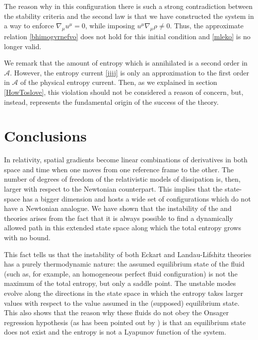 \documentclass[a4paper, amsfonts, amssymb, amsmath, reprint, showkeys, nofootinbib, twoside]{revtex4-1}
\begin{document}
The reason why in this configuration there is such a strong contradiction between the stability criteria and the second law is that we have constructed the system in a way to enforce $\nabla_\mu u^\mu =0$, while imposing $u^\mu \nabla_\mu \rho \neq 0$. Thus, the approximate relation \eqref{bhimogvrnefvo} does not hold for this initial condition and \eqref{mleko} is no longer valid. 

We remark that the amount of entropy which is annihilated is a second order in $\mathcal{A}$. However, the entropy current \eqref{jjjj} is only an approximation to the first order in $\mathcal{A}$ of the physical entropy current. Then, as we explained in section \ref{HowToslove}, this violation should not be considered a reason of concern, but, instead, represents the fundamental origin of the success of the theory.


\section{Conclusions}

In relativity, spatial gradients become linear combinations of derivatives in both space and time when one moves from one reference frame to the other. The number of degrees of freedom of the relativistic models of dissipation is, then, larger with respect to the Newtonian counterpart. This implies that the state-space has a bigger dimension and hosts a wide set of configurations which do not have a Newtonian analogue. We have shown that the instability of the \citet{Eckart1940} and \citet{landau6} theories arises from the fact that it is always possible to find a dynamically allowed path in this extended state space along which the total entropy grows with no bound. 

This fact tells us that the instability of both Eckart and Landau-Lifshitz theories has a purely thermodynamic nature: the assumed equilibrium state of the fluid (such as, for example, an homogeneous perfect fluid configuration) is not the maximum of the total entropy, but only a saddle point. The unstable modes evolve along the directions in the state space in which the entropy takes larger values with respect to the value assumed in the (supposed) equilibrium state. 
This also shows that the reason why these fluids do not obey the Onsager regression hypothesis (as has been pointed out by \citet{Garcia2009}) is that an equilibrium state does not exist and the entropy is not a Lyapunov function of the system.
\end{document}
